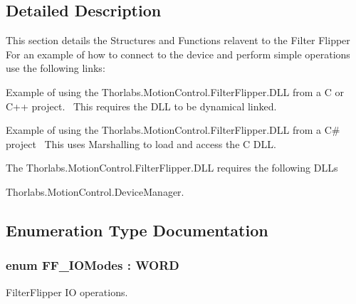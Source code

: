 \subsection{Detailed Description}
This section details the Structures and Functions relavent to the Filter Flipper~\newline
 For an example of how to connect to the device and perform simple operations use the following links\+: 
\begin{DoxyItemize}
\item Example of using the Thorlabs.Motion\+Control.Filter\+Flipper.D\+LL from a C or C++ project.~\newline
 This requires the D\+LL to be dynamical linked.  
\item Example of using the Thorlabs.Motion\+Control.Filter\+Flipper.D\+LL from a C\# project~\newline
 This uses Marshalling to load and access the C D\+LL.  
\end{DoxyItemize}The Thorlabs.\+Motion\+Control.\+Filter\+Flipper.\+D\+LL requires the following D\+L\+Ls 
\begin{DoxyItemize}
\item Thorlabs.\+Motion\+Control.\+Device\+Manager.  
\end{DoxyItemize}

\subsection{Enumeration Type Documentation}
\subsubsection[{\texorpdfstring{F\+F\+\_\+\+I\+O\+Modes}{FF_IOModes}}]{\setlength{\rightskip}{0pt plus 5cm}enum {\bf F\+F\+\_\+\+I\+O\+Modes} \+: W\+O\+RD}\hypertarget{group___filter_flipper_ga3f9223ae197e5703d709034a238d3925}{}\label{group___filter_flipper_ga3f9223ae197e5703d709034a238d3925}


Filter\+Flipper IO operations. 

